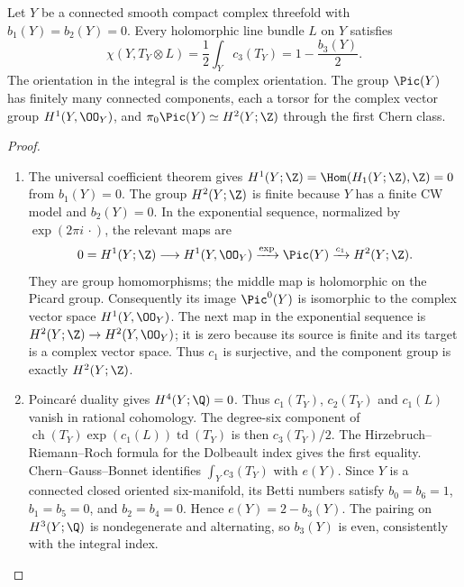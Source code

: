 \begin{proposition}\hypertarget{tag-01BN}{}\label{cdp:st:C.1.1}

Let $Y$ be a connected smooth compact complex threefold with
$b_1(Y)=b_2(Y)=0$. Every holomorphic line bundle $L$ on $Y$ satisfies
\[
 \chi(Y,T_Y\otimes L)=\frac12\int_Yc_3(T_Y)
 =1-\frac{b_3(Y)}2.
\]
The orientation in the integral is the complex orientation. The group
$\Pic(Y)$ has finitely many connected components, each a torsor for the
complex vector group $H^1(Y,\OO_Y)$, and
$\pi_0\Pic(Y)\simeq H^2(Y;\Z)$ through the first Chern class.
\end{proposition}


\begin{proof}

\begin{enumerate}[label={$\langle1\rangle$\arabic*.},leftmargin=*]
\item The universal coefficient theorem gives
$H^1(Y;\Z)=\Hom(H_1(Y;\Z),\Z)=0$ from $b_1(Y)=0$.
The group $H^2(Y;\Z)$ is finite because $Y$ has a finite CW model and
$b_2(Y)=0$. In the exponential sequence, normalized by
$\exp(2\pi i\,\cdot)$, the relevant maps are
\[
0=H^1(Y;\Z)\longrightarrow H^1(Y,\OO_Y)
 \xrightarrow{\exp} \Pic(Y)
 \xrightarrow{c_1} H^2(Y;\Z).
\]
They are group homomorphisms; the middle map is holomorphic on the
Picard group. Consequently its image $\Pic^0(Y)$ is isomorphic to the
complex vector space $H^1(Y,\OO_Y)$. The next map in the exponential
sequence is $H^2(Y;\Z)\to H^2(Y,\OO_Y)$; it is zero because its
source is finite and its target is a complex vector space. Thus
$c_1$ is surjective, and the component group is exactly $H^2(Y;\Z)$.

\item Poincar\'e duality gives $H^4(Y;\Q)=0$. Thus
$c_1(T_Y)$, $c_2(T_Y)$ and $c_1(L)$ vanish in rational cohomology.
The degree-six component of
$\operatorname{ch}(T_Y)\exp(c_1(L))\operatorname{td}(T_Y)$ is then
$c_3(T_Y)/2$. The Hirzebruch--Riemann--Roch formula for the Dolbeault
index gives the first equality. Chern--Gauss--Bonnet identifies
$\int_Yc_3(T_Y)$ with $e(Y)$. Since $Y$ is a connected closed oriented
six-manifold, its Betti numbers satisfy
$b_0=b_6=1$, $b_1=b_5=0$, and $b_2=b_4=0$. Hence
$e(Y)=2-b_3(Y)$. The pairing on $H^3(Y;\Q)$ is nondegenerate and
alternating, so $b_3(Y)$ is even, consistently with the integral index.


\end{enumerate}
\end{proof}